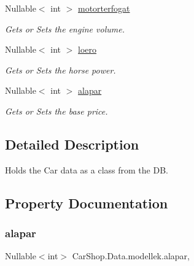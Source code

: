 \begin{DoxyCompactItemize}
Nullable$<$ int $>$ \mbox{\hyperlink{class_car_shop_1_1_data_1_1modellek_ade5249b6dd8597bd01c93ec16da479a3}{motorterfogat}}
\begin{DoxyCompactList}\small\item\em Gets or Sets the engine volume. \end{DoxyCompactList}\item 
Nullable$<$ int $>$ \mbox{\hyperlink{class_car_shop_1_1_data_1_1modellek_a2151870c37ac25429aab6cbbdaded6a9}{loero}}
\begin{DoxyCompactList}\small\item\em Gets or Sets the horse power. \end{DoxyCompactList}\item 
Nullable$<$ int $>$ \mbox{\hyperlink{class_car_shop_1_1_data_1_1modellek_ad9b0c537ff0f2f1b7e1437d95601a68a}{alapar}}
\begin{DoxyCompactList}\small\item\em Gets or Sets the base price. \end{DoxyCompactList}\end{DoxyCompactItemize}


\subsection{Detailed Description}
Holds the Car data as a class from the DB. 



\subsection{Property Documentation}
\mbox{\label{class_car_shop_1_1_data_1_1modellek_ad9b0c537ff0f2f1b7e1437d95601a68a}} 
\subsubsection{\texorpdfstring{alapar}{alapar}}
{\footnotesize\ttfamily Nullable$<$int$>$ Car\+Shop.\+Data.\+modellek.\+alapar\hspace{0.3cm}{\ttfamily [get]}, {\ttfamily [set]}}



